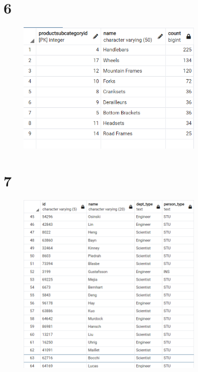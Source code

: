 \documentclass{article}
\begin{document}
\section{6}
\begin{figure}[H]
    \centering
    \includegraphics[width=0.8\textwidth]{figures/6.png}
    \caption
	{
	}
    \label{fig:fig1}
\end{figure}

\section{7}
\begin{figure}[H]
    \centering
    \includegraphics[width=0.8\textwidth]{figures/7.png}
    \caption
	{
	}
    \label{fig:fig1}
\end{figure}
\end{document}
